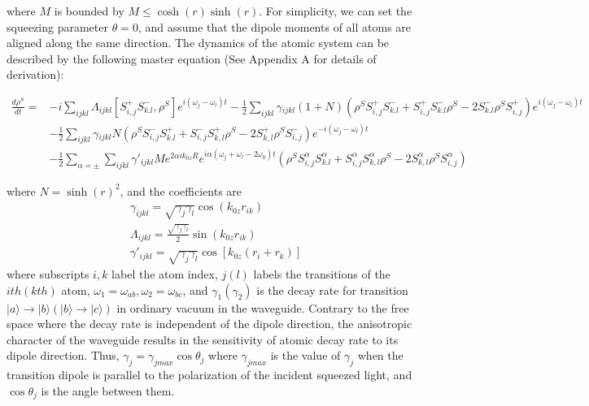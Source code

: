 \documentclass[aps,showpacs,twocolumn,twoside,groupedaddress]{revtex4}
\begin{document}
where $M$ is bounded by $M\leq\cosh(r)\sinh(r)$. For simplicity, we can set the squeezing parameter $\theta=0$, and assume that the dipole moments of all atoms are aligned along the same direction. The dynamics of the atomic system can be described by the following master equation (See Appendix A for details of derivation):
\begin{widetext}
\begin{equation}
\label{eq1}
\begin{split}
\frac{d\rho^{S}}{dt}=&-i\underset{ijkl}{\sum}\Lambda_{ijkl}[S_{i,j}^{+}S_{k.l}^{-},\rho^{S}]e^{i(\omega_{j}-\omega_{l})t}-\frac{1}{2}\underset{ijkl}{\sum}\gamma{}_{ijkl}(1+N)(\rho^{S}S_{i,j}^{+}S_{k.l}^{-}+S_{i,j}^{+}S_{k.l}^{-}\rho^{S}-2S_{k.l}^{-}\rho^{S}S_{i,j}^{+})e^{i(\omega_{j}-\omega_{l})t}\\
&-\frac{1}{2}\underset{ijkl}{\sum}\gamma{}_{ijkl}N(\rho^{S}S_{i,j}^{-}S_{k.l}^{+}+S_{i,j}^{-}S_{k,l}^{+}\rho^{S}-2S_{k,l}^{+}\rho^{S}S_{i,j}^{-})e^{-i(\omega_{j}-\omega_{l})t}\\
&-\frac{1}{2}\sum_{\alpha=\pm}\underset{ijkl}{\sum}\gamma'_{ijkl}Me^{2\alpha ik_{0z}R}e^{i\alpha(\omega_{j}+\omega_{l}-2\omega_{0})t}(\rho^{S}S_{i,j}^{\alpha}S_{k.l}^{\alpha}+S_{i,j}^{\alpha}S_{k,l}^{\alpha}\rho^{S}-2S_{k,l}^{\alpha}\rho^{S}S_{i,j}^{\alpha})
\end{split}
\end{equation}
\end{widetext}
where $N=\sinh(r)^2$, and the coefficients are
\begin{equation}
\label{eq2}
\begin{split}
& \gamma_{ijkl}=\sqrt{\gamma_{j}\gamma_{l}}\cos(k_{0z}r_{ik}) \\
& \Lambda_{ijkl}=\frac{\sqrt{\gamma_{j}\gamma_{l}}}{2}\sin(k_{0z}r_{ik})\\
& \gamma'_{ijkl}=\sqrt{\gamma_{j}\gamma_{l}}\cos[k_{0z}(r_{i}+r_{k})]
\end{split}
\end{equation}
where subscripts $i,k$ label the atom index, $j(l)$ labels the transitions of the $ith (kth)$ atom, $\omega_1=\omega_{ab}, \omega_2=\omega_{bc}$, and $\gamma_{1}(\gamma_{2})$ is the decay rate for transition $|a\rangle\rightarrow|b\rangle(|b\rangle\rightarrow|c\rangle)$ in ordinary vacuum in the waveguide. Contrary to the free space where the decay rate is independent of the dipole direction, the anisotropic character of the waveguide results in the sensitivity of atomic decay rate to its dipole direction. Thus, $\gamma_j=\gamma_{jmax}\cos\theta_j$ where $\gamma_{jmax}$ is the value of $\gamma_{j}$ when the transition dipole is parallel to the polarization of the incident squeezed light, and $\cos\theta_j$ is the angle between them.
\end{document}
